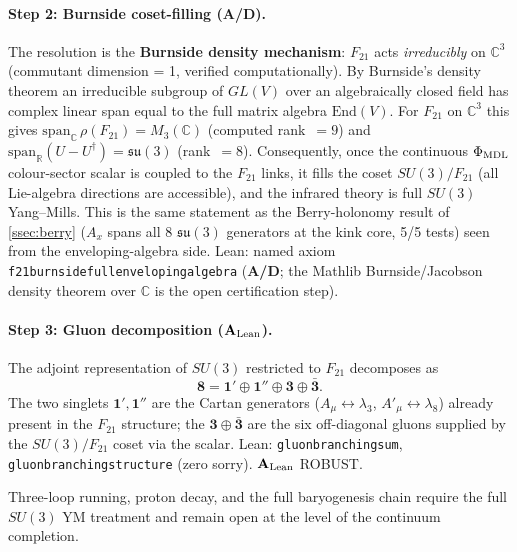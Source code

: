 \documentclass[11pt]{article}
\theoremstyle{remark}
\newcommand{\Ftwentyone}{F_{21}}
\newcommand{\lean}[1]{%
  \penalty-100
  \begingroup\def\_{\textunderscore\allowbreak}\texttt{#1}\endgroup}
\newcommand{\CatAL}{\ensuremath{\textbf{A}_{\rm Lean}}}
\newcommand{\CatAD}{\textbf{A/D}}
\begin{document}
\paragraph{Step 2: Burnside coset-filling (\CatAD{}).}
The resolution is the \textbf{Burnside density mechanism}: $\Ftwentyone$ acts
\emph{irreducibly} on $\mathbb{C}^3$ (commutant dimension = 1, verified
computationally).  By Burnside's density theorem an irreducible subgroup of $GL(V)$
over an algebraically closed field has complex linear span equal to the full matrix
algebra $\mathrm{End}(V)$.  For $\Ftwentyone$ on $\mathbb{C}^3$ this gives
$\mathrm{span}_{\mathbb{C}}\,\rho(\Ftwentyone)=M_3(\mathbb{C})$ (computed rank~$=9$)
and $\mathrm{span}_{\mathbb{R}}(U-U^\dagger)=\mathfrak{su}(3)$ (rank~$=8$).
Consequently, once the continuous $\Phi_{\rm MDL}$ colour-sector scalar is coupled
to the $\Ftwentyone$ links, it fills the coset $SU(3)/\Ftwentyone$ (all Lie-algebra
directions are accessible), and the infrared theory is full $SU(3)$ Yang--Mills.
This is the same statement as the Berry-holonomy result of \cref{ssec:berry} ($A_x$
spans all 8 $\mathfrak{su}(3)$ generators at the kink core, 5/5 tests) seen from
the enveloping-algebra side.
Lean: named axiom \lean{f21\_burnside\_full\_enveloping\_algebra} (\CatAD{};
the Mathlib Burnside/Jacobson density theorem over $\mathbb{C}$ is the open
certification step).

\paragraph{Step 3: Gluon decomposition (\CatAL{}).}
The adjoint representation of $SU(3)$ restricted to $\Ftwentyone$ decomposes as
\begin{equation}
  \mathbf{8} = \mathbf{1}' \oplus \mathbf{1}'' \oplus \mathbf{3} \oplus \bar{\mathbf{3}}.
  \label{eq:gluon_branching}
\end{equation}
The two singlets $\mathbf{1}',\mathbf{1}''$ are the Cartan generators
($A_\mu \leftrightarrow \lambda_3$, $A'_\mu \leftrightarrow \lambda_8$) already present
in the $\Ftwentyone$ structure; the $\mathbf{3}\oplus\bar{\mathbf{3}}$ are the
six off-diagonal gluons supplied by the $SU(3)/\Ftwentyone$ coset via the scalar.
Lean: \lean{gluon\_branching\_sum}, \lean{gluon\_branching\_structure} (zero sorry).
\CatAL{} ROBUST.

Three-loop running, proton decay, and the full baryogenesis chain require the full
$SU(3)$ YM treatment and remain open at the level of the continuum completion.
\end{document}
